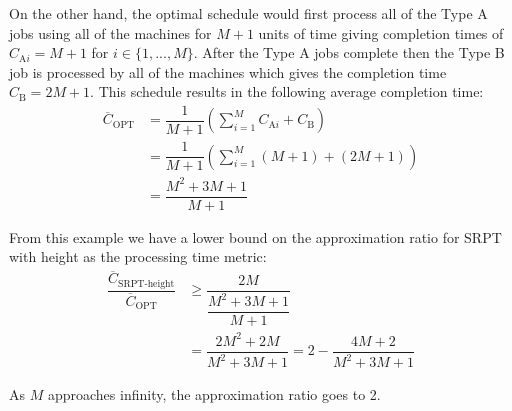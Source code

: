 On the other hand, the optimal schedule would first process all of the Type A jobs using all of the machines for $M+1$ units of time giving completion times of $C_{\text{A}i}=M+1$ for $i\in\{1,...,M\}$.
After the Type A jobs complete then the Type B job is processed by all of the machines which gives the completion time $C_\text{B}=2M+1$.
This schedule results in the following average completion time:
\begin{align}
	\overline{C}_\text{OPT} & =  \dfrac{1}{M+1}\left(\sum_{i=1}^M C_{\text{A}i} + C_{\text{B}}\right) \nonumber \\
	& =  \dfrac{1}{M+1}\left(\sum_{i=1}^M (M+1) + (2M+1)\right) \nonumber \\
	& =  \dfrac{M^2+3M+1}{M+1}
\end{align}

From this example we have a lower bound on the approximation ratio for SRPT with height as the processing time metric:
\begin{align}
	\dfrac{\overline{C}_\text{SRPT-height}}{\overline{C}_\text{OPT}} & \geq \dfrac{2M}{\dfrac{M^2+3M+1}{M+1}} \nonumber \\
	& = \dfrac{2M^2+2M}{M^2+3M+1} = 2-\dfrac{4M+2}{M^2+3M+1}
\end{align}

As $M$ approaches infinity, the approximation ratio goes to 2.


